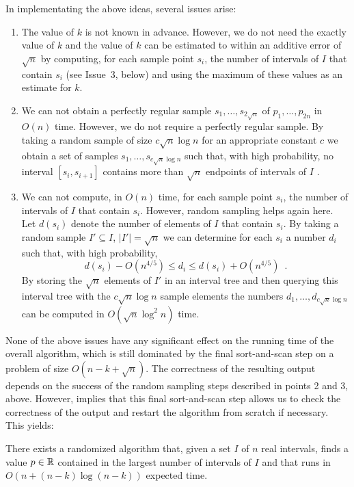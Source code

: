 \documentclass[charterfonts,lotsofwhite]{patmorin}
\begin{document}
In implementating the above ideas, several issues arise:

\begin{enumerate}

\item The value of $k$ is not known in advance.  However, we do not
need the exactly value of $k$ and the value of $k$ can be estimated to
within an additive error of $\sqrt{n}$ by computing, for each sample
point $s_i$, the number of intervals of $I$ that contain $s_i$ (see
Issue~3, below) and using the maximum of these values as an estimate
for $k$.

\item We can not obtain a perfectly regular sample
$s_1,\ldots,s_{2\sqrt{n}}$ of $p_1,\ldots,p_{2n}$ in $O(n)$ time.
However, we do not require a perfectly regular sample.  By taking a
random sample of size $c\sqrt{n}\log n$ for an appropriate constant
$c$ we obtain a set of samples $s_1,\ldots,s_{c\sqrt{n}\log n}$ such
that, with high probability, no interval $[s_{i},s_{i+1}]$ contains
more than $\sqrt{n}$ endpoints of intervals of $I$ \cite{m98}.

\item We can not compute, in $O(n)$ time, for each sample point $s_i$,
the number of intervals of $I$ that contain $s_i$.  However, random
sampling helps again here.  Let $d(s_i)$ denote the number of elements
of $I$ that contain $s_i$. By taking a random sample $I'\subseteq I$,
$|I'|=\sqrt{n}$ we can determine for each $s_i$ a
number $d_i$ such that, with high probability,
\[
        d(s_i) - O(n^{4/5})\le d_i \le
           d(s_i) + O(n^{4/5}) \enspace .
\]
By storing the $\sqrt{n}$ elements of $I'$ in an interval tree \cite{ps85} and
then querying this interval tree with the $c\sqrt{n}\log n$ sample
elements the numbers $d_1,\ldots,d_{c\sqrt{n}\log n}$ can be computed
in $O(\sqrt{n}\log^2 n)$
time.  
\end{enumerate}

None of the above issues have any significant effect on the running
time of the overall algorithm, which is still dominated by the final
sort-and-scan step on a problem of size $O(n-k+\sqrt{n})$.  The
correctness of the resulting output depends on the success of the
random sampling steps described in points 2 and 3, above.  However,
 implies that this final sort-and-scan step allows us
to check the correctness of the output and restart the algorithm from
scratch if necessary.  This yields:

\begin{thm}
There exists a randomized algorithm that, given a set $I$ of $n$ real
intervals, finds a value $p\in\mathbb{R}$ contained in the largest number of
intervals of $I$ and that runs in $O(n+(n-k)\log (n-k))$ expected time.
\end{thm}
\end{document}
